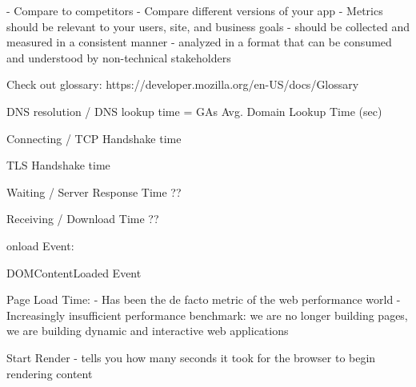 



- Compare to competitors
- Compare different versions of your app
- Metrics should be relevant to your users, site, and business goals
- should be collected and measured in a consistent manner
- analyzed in a format that can be consumed and understood by non-technical stakeholders





Check out glossary: https://developer.mozilla.org/en-US/docs/Glossary



DNS resolution / DNS lookup time %
= GAs Avg. Domain Lookup Time (sec) %


Connecting / TCP Handshake time %


TLS Handshake time %


Waiting / Server Response Time ?? %


Receiving / Download Time ?? %




onload Event: %


DOMContentLoaded Event %




Page Load Time: %
- Has been the de facto metric of the web performance world
- Increasingly insufficient performance benchmark: we are no longer building pages, we are building dynamic and interactive web applications




Start Render %
- tells you how many seconds it took for the browser to begin rendering content



